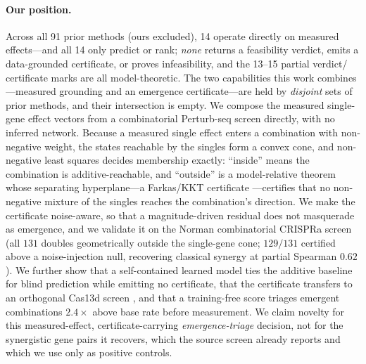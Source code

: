 \paragraph{Our position.}
Across all 91 prior methods (ours excluded), 14 operate directly on measured effects---and
all 14 only predict or rank; \emph{none} returns a feasibility verdict, emits a
data-grounded certificate, or proves infeasibility, and the 13--15 partial verdict/%
certificate marks are all model-theoretic. The two capabilities this work
combines---measured grounding and an emergence certificate---are held by
\emph{disjoint} sets of prior methods, and their intersection is empty. We compose the
measured single-gene effect vectors from a combinatorial Perturb-seq screen
\citep{Norman2019} directly, with no inferred network. Because a measured single effect enters
a combination with non-negative weight, the states reachable by the singles form a convex cone,
and non-negative least squares \citep{LawsonHanson1974} decides membership exactly: ``inside''
means the combination is additive-reachable, and ``outside'' is a model-relative theorem whose
separating hyperplane---a Farkas/KKT certificate \citep{Farkas1902}---certifies that no
non-negative mixture of the singles reaches the combination's direction. We make the certificate
noise-aware, so that a magnitude-driven residual does not masquerade as emergence, and we
validate it on the Norman combinatorial CRISPRa screen (all $131$ doubles geometrically outside
the single-gene cone; $129/131$ certified above a noise-injection null, recovering classical
synergy at partial Spearman $0.62$). We further show that a self-contained learned model ties the
additive baseline for blind prediction \citep{AhlmannEltze2025} while emitting no certificate,
that the certificate transfers to an orthogonal Cas13d screen \citep{Wessels2023}, and that a
training-free score triages emergent combinations $2.4\times$ above base rate before measurement.
We claim novelty for this measured-effect, certificate-carrying \emph{emergence-triage} decision,
not for the synergistic gene pairs it recovers, which the source screen \citep{Norman2019}
already reports and which we use only as positive controls.
